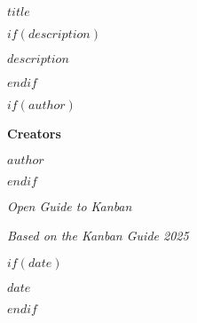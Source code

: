 \begin{titlepage}
  \centering
  
  \vspace*{2cm}
  {\Huge\bfseries $title$ \par}
  \vspace{1cm}
  
  $if(description)$
  {\large $description$ \par}
  \vspace{1.5cm}
  $endif$
  
  $if(author)$
  \vspace{1cm}
  {\Large\textbf{Creators} \par}
  \vspace{0.5cm}
  
  \begin{center}
  {\large $author$ \par}
  \end{center}
  $endif$
  
  \vfill
  
  {\small\textit{Open Guide to Kanban} \par}
  {\small\textit{Based on the Kanban Guide 2025} \par}
  
  $if(date)$
  \vspace{0.5cm}
  {\large $date$ \par}
  $endif$
  
\end{titlepage}
\clearpage
